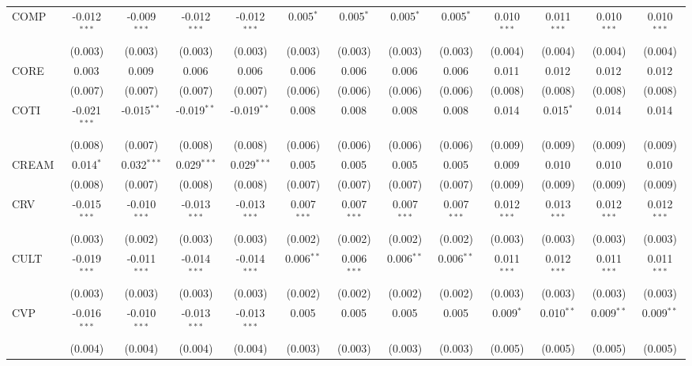 \begin{table}[!htbp]
\begin{tabular}{@{\extracolsep{5pt}}lcccccccccccc}
 COMP & -0.012$^{***}$ & -0.009$^{***}$ & -0.012$^{***}$ & -0.012$^{***}$ & 0.005$^{*}$ & 0.005$^{*}$ & 0.005$^{*}$ & 0.005$^{*}$ & 0.010$^{***}$ & 0.011$^{***}$ & 0.010$^{***}$ & 0.010$^{***}$ \\
  & (0.003) & (0.003) & (0.003) & (0.003) & (0.003) & (0.003) & (0.003) & (0.003) & (0.004) & (0.004) & (0.004) & (0.004) \\
 CORE & 0.003$^{}$ & 0.009$^{}$ & 0.006$^{}$ & 0.006$^{}$ & 0.006$^{}$ & 0.006$^{}$ & 0.006$^{}$ & 0.006$^{}$ & 0.011$^{}$ & 0.012$^{}$ & 0.012$^{}$ & 0.012$^{}$ \\
  & (0.007) & (0.007) & (0.007) & (0.007) & (0.006) & (0.006) & (0.006) & (0.006) & (0.008) & (0.008) & (0.008) & (0.008) \\
 COTI & -0.021$^{***}$ & -0.015$^{**}$ & -0.019$^{**}$ & -0.019$^{**}$ & 0.008$^{}$ & 0.008$^{}$ & 0.008$^{}$ & 0.008$^{}$ & 0.014$^{}$ & 0.015$^{*}$ & 0.014$^{}$ & 0.014$^{}$ \\
  & (0.008) & (0.007) & (0.008) & (0.008) & (0.006) & (0.006) & (0.006) & (0.006) & (0.009) & (0.009) & (0.009) & (0.009) \\
 CREAM & 0.014$^{*}$ & 0.032$^{***}$ & 0.029$^{***}$ & 0.029$^{***}$ & 0.005$^{}$ & 0.005$^{}$ & 0.005$^{}$ & 0.005$^{}$ & 0.009$^{}$ & 0.010$^{}$ & 0.010$^{}$ & 0.010$^{}$ \\
  & (0.008) & (0.007) & (0.008) & (0.008) & (0.007) & (0.007) & (0.007) & (0.007) & (0.009) & (0.009) & (0.009) & (0.009) \\
 CRV & -0.015$^{***}$ & -0.010$^{***}$ & -0.013$^{***}$ & -0.013$^{***}$ & 0.007$^{***}$ & 0.007$^{***}$ & 0.007$^{***}$ & 0.007$^{***}$ & 0.012$^{***}$ & 0.013$^{***}$ & 0.012$^{***}$ & 0.012$^{***}$ \\
  & (0.003) & (0.002) & (0.003) & (0.003) & (0.002) & (0.002) & (0.002) & (0.002) & (0.003) & (0.003) & (0.003) & (0.003) \\
 CULT & -0.019$^{***}$ & -0.011$^{***}$ & -0.014$^{***}$ & -0.014$^{***}$ & 0.006$^{**}$ & 0.006$^{***}$ & 0.006$^{**}$ & 0.006$^{**}$ & 0.011$^{***}$ & 0.012$^{***}$ & 0.011$^{***}$ & 0.011$^{***}$ \\
  & (0.003) & (0.003) & (0.003) & (0.003) & (0.002) & (0.002) & (0.002) & (0.002) & (0.003) & (0.003) & (0.003) & (0.003) \\
 CVP & -0.016$^{***}$ & -0.010$^{***}$ & -0.013$^{***}$ & -0.013$^{***}$ & 0.005$^{}$ & 0.005$^{}$ & 0.005$^{}$ & 0.005$^{}$ & 0.009$^{*}$ & 0.010$^{**}$ & 0.009$^{**}$ & 0.009$^{**}$ \\
  & (0.004) & (0.004) & (0.004) & (0.004) & (0.003) & (0.003) & (0.003) & (0.003) & (0.005) & (0.005) & (0.005) & (0.005) \\

\end{tabular}
\end{table}
